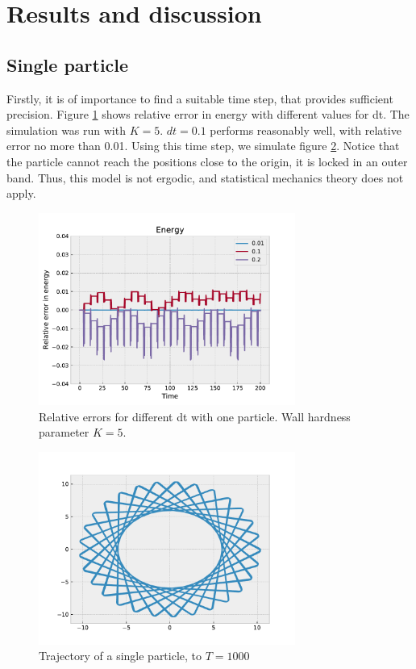\documentclass[a4paper,12pt]{article}
\begin{document}
\section{Results and discussion}
\subsection{Single particle}
Firstly, it is of importance to find a suitable time step, that provides sufficient precision.
Figure \ref{fig:error_one} shows relative error in energy with different values for dt.
The simulation was run with $K = 5$.
$dt = 0.1$ performs reasonably well, with relative error no more than 0.01.
Using this time step, we simulate figure \ref{fig:traj_one}.
Notice that the particle cannot reach the positions close to the origin, it is locked in an outer band.
Thus, this model is not ergodic, and statistical mechanics theory does not apply.
\begin{figure}[ht]
  \centering
  \includegraphics[width=0.75\textwidth]{media/errors_one_particle}
  \caption{Relative errors for different dt with one particle. Wall hardness parameter $K=5$.\label{fig:error_one}}
\end{figure}

\begin{figure}[ht]
  \centering
  \includegraphics[width=0.75\textwidth]{media/trajectory_one_particle}
  \caption{Trajectory of a single particle, to $T=1000$\label{fig:traj_one}}
\end{figure}
\end{document}
